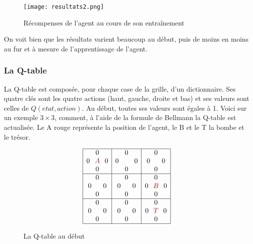 \begin{figure}[!ht]
\hspace*{0cm}\texttt{[image: resultats2.png]}
\caption{Récompenses de l'agent au cours de son entraînement}
\label{recompgraph2}
\end{figure}

On voit bien que les résultats varient beaucoup au début, puis de moins en moins au fur et à mesure de l'apprentissage de l'agent. 

\subsubsection*{La Q-table}

La Q-table est composée, pour chaque case de la grille, d'un dictionnaire. Ses quatre clés sont les quatre actions (haut, gauche, droite et bas) et ses valeurs sont celles de $Q(etat, action)$. Au début, toutes ses valeurs sont égales à 1. Voici sur un exemple $3\times 3$, comment, à l'aide de la formule de Bellmann la Q-table est actualisée. Le A rouge représente la position de l'agent, le B et le T la bombe et le trésor.

\begin{figure}[!ht]
\centering
$$\begin{array}{|c|c|c|}
\hline
0                      & 0                           & 0 \\
0\hspace*{0.25cm}\textcolor{red}{A}\hspace*{0.25cm} 0 & 0\hspace*{0.8cm} 0                  & 0\hspace*{0.6cm}0 \\
0          & 0          & 0 \\
\hline
0          & 0                            & 0 \\
0\hspace*{0.6cm}0   & 0\hspace*{0.6cm} 0                  & 0\hspace*{0.25cm}\textcolor{red}{B}\hspace*{0.25cm} 0 \\
0           & 0          & 0 \\
\hline
0          & 0                         & 0\\
0\hspace*{0.6cm} 0                     & 0\hspace*{0.6cm}0                & 0\hspace*{0.25cm}\textcolor{red}{T}\hspace*{0.25cm} 0 \\
0                            & 0        & 0 \\
\hline
\end{array}
$$
\caption{La Q-table au début}
\end{figure}

